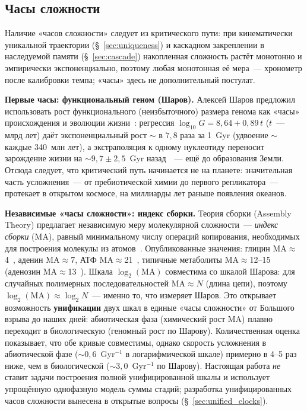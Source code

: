 \documentclass[12pt,a4paper]{article}
\begin{document}
\subsection{Часы сложности}
\label{sec:complexity_clocks}

Наличие «часов сложности» следует из критического пути: при кинематически уникальной траектории (\S~\ref{sec:uniqueness}) и каскадном закреплении в наследуемой памяти (\S~\ref{sec:cascade}) накопленная сложность растёт монотонно и эмпирически экспоненциально, поэтому любая монотонная её мера~--- хронометр после калибровки темпа; «часы» здесь не дополнительный постулат.

\textbf{Первые часы: функциональный геном (Шаров).} Алексей Шаров предложил использовать рост функционального (неизбыточного) размера генома как «часы» происхождения и эволюции жизни~\cite{Sharov}: регрессия $\log_{10}G = 8{,}64 + 0{,}89\,t$ ($t$~--- млрд лет) даёт экспоненциальный рост $\sim$ в $7{,}8$ раза за 1~Gyr (удвоение $\sim$ каждые 340~млн лет), а экстраполяция к одному нуклеотиду переносит зарождение жизни на $\sim 9{,}7 \pm 2{,}5$~Gyr назад~\cite{Sharov2013}~--- ещё до образования Земли. Отсюда следует, что критический путь начинается не на планете: значительная часть усложнения~--- от пребиотической химии до первого репликатора~--- протекает в открытом космосе, на миллиарды лет раньше появления океанов.

\textbf{Независимые «часы сложности»: индекс сборки.} Теория сборки (Assembly Theory) предлагает независимую меру молекулярной сложности~--- \emph{индекс сборки} (MA), равный минимальному числу операций копирования, необходимых для построения молекулы из атомов~\cite{Marshall2021,Cronin2023}. Опубликованные значения: глицин MA$\approx$4~\cite{Marshall2021}, аденин MA$\approx$7, АТФ MA$\approx$21~\cite{Mathis2021}, типичные метаболиты MA$\approx$12--15 (аденозин MA$\approx$13~\cite{Marshall2021}). Шкала $\log_2(\mathrm{MA})$ совместима со шкалой Шарова: для случайных полимерных последовательностей MA$\approx N$ (длина цепи), поэтому $\log_2(\mathrm{MA}) \approx \log_2 N$~--- именно то, что измеряет Шаров. Это открывает возможность \textbf{унификации} двух шкал в единые «часы сложности» от Большого взрыва до наших дней: абиотическая фаза (химический рост MA) плавно переходит в биологическую (геномный рост по Шарову). Количественная оценка показывает, что обе кривые совместимы, однако скорость усложнения в абиотической фазе ($\sim 0{,}6$~Gyr$^{-1}$ в логарифмической шкале) примерно в 4--5 раз ниже, чем в биологической ($\sim 3{,}0$~Gyr$^{-1}$ по Шарову). Настоящая работа \emph{не} ставит задачи построения полной унифицированной шкалы и использует упрощённую однофазную модель суммы стадий; разработка унифицированных часов сложности вынесена в открытые вопросы (\S~\ref{sec:unified_clocks}).
\end{document}
